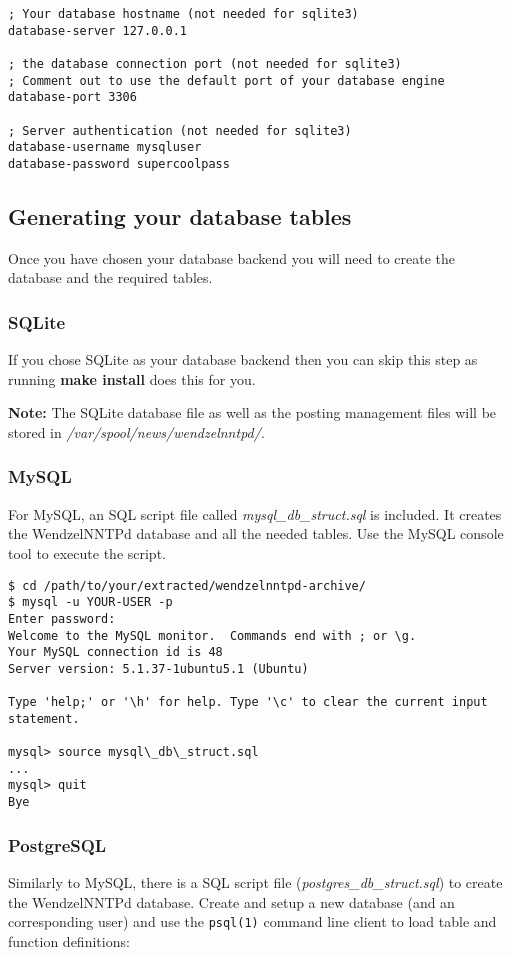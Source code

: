 \begin{verbatim}
; Your database hostname (not needed for sqlite3)
database-server 127.0.0.1

; the database connection port (not needed for sqlite3)
; Comment out to use the default port of your database engine
database-port 3306

; Server authentication (not needed for sqlite3)
database-username mysqluser
database-password supercoolpass
\end{verbatim}

\subsection{Generating your database tables}

Once you have chosen your database backend you will need to create the database and the required tables.

\subsubsection{SQLite}

If you chose SQLite as your database backend then you can skip this step as running \textbf{make install} does this for you.

\textbf{Note:} The SQLite database file as well as the posting management files will be stored in \textit{/var/spool/news/wendzelnntpd/}.

\subsubsection{MySQL}

For MySQL, an SQL script file called \textit{mysql\_db\_struct.sql} is included. It creates the WendzelNNTPd database and all the needed tables. Use the MySQL console tool to execute the script.

\begin{verbatim}
$ cd /path/to/your/extracted/wendzelnntpd-archive/
$ mysql -u YOUR-USER -p
Enter password:
Welcome to the MySQL monitor.  Commands end with ; or \g.
Your MySQL connection id is 48
Server version: 5.1.37-1ubuntu5.1 (Ubuntu)

Type 'help;' or '\h' for help. Type '\c' to clear the current input statement.

mysql> source mysql\_db\_struct.sql
...
mysql> quit
Bye
\end{verbatim}


\subsubsection{PostgreSQL}
Similarly to MySQL, there is a SQL script file (\textit{postgres\_db\_struct.sql}) to create the WendzelNNTPd database. Create and setup a new database (and an corresponding user) and use the \texttt{psql(1)} command line client to load table and function definitions:

